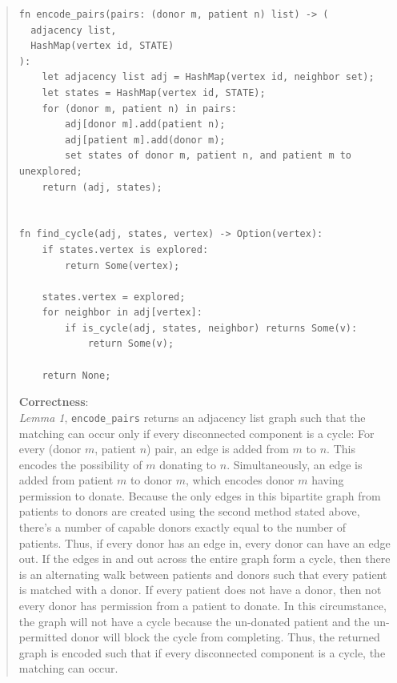 \documentclass[11pt]{article}
\begin{document}
\begin{enumerate}
\begin{enumerate}
\begin{quote}
\begin{verbatim}
fn encode_pairs(pairs: (donor m, patient n) list) -> (
  adjacency list, 
  HashMap(vertex id, STATE)
):
    let adjacency list adj = HashMap(vertex id, neighbor set);
    let states = HashMap(vertex id, STATE);
    for (donor m, patient n) in pairs:
        adj[donor m].add(patient n);
        adj[patient m].add(donor m);
        set states of donor m, patient n, and patient m to unexplored;
    return (adj, states);


fn find_cycle(adj, states, vertex) -> Option(vertex):
    if states.vertex is explored:
        return Some(vertex);

    states.vertex = explored;
    for neighbor in adj[vertex]:
        if is_cycle(adj, states, neighbor) returns Some(v):
            return Some(v);

    return None;
  \end{verbatim}

  \textbf{Correctness}: \\ 
  \textit{Lemma 1}, \texttt{encode\_pairs} returns an adjacency list graph such that the matching can occur only if every disconnected component is a cycle: For every (donor $m$, patient $n$) pair, an edge is added from $m$ to $n$. This encodes the possibility of $m$ donating to $n$. Simultaneously, an edge is added from patient $m$ to donor $m$, which encodes donor $m$ having permission to donate. Because the only edges in this bipartite graph from patients to donors are created using the second method stated above, there's a number of capable donors exactly equal to the number of patients. Thus, if every donor has an edge in, every donor can have an edge out. If the edges in and out across the entire graph form a cycle, then there is an alternating walk between patients and donors such that every patient is matched with a donor. If every patient does not have a donor, then not every donor has permission from a patient to donate. In this circumstance, the graph will not have a cycle because the un-donated patient and the un-permitted donor will block the cycle from completing. Thus, the returned graph is encoded such that if every disconnected component is a cycle, the matching can occur.  


\end{quote}
\end{enumerate}
\end{enumerate}
\end{document}
